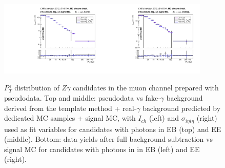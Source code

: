 \begin{figure}[htb]
\begin{center}
\includegraphics[width=0.45\textwidth]{../figs/figs_v11/MUON_ZGamma/PrepareYields/c_BkgSubtrDATAvsSIGMC_c_MUON_ZGamma__UNblind_MCclosure__Barrel__phoEt_MCclosure.pdf}\includegraphics[width=0.45\textwidth]{../figs/figs_v11/MUON_ZGamma/PrepareYields/c_BkgSubtrDATAvsSIGMC_c_MUON_ZGamma__UNblind_MCclosure__Endcap__phoEt_MCclosure.pdf}\\
  \caption{$P_T^{\gamma}$ distribution of $Z\gamma$ candidates in the muon channel prepared with pseudodata. Top and middle: pseudodata vs fake-$\gamma$ background derived from the template method + real-$\gamma$ background predicted by dedicated MC samples + signal MC, with $I_{ch}$ (left) and $\sigma_{i\eta i\eta}$ (right) used as fit variables for candidates with photons in EB (top) and EE (middle). Bottom: data yields after full background subtraction vs signal MC for candidates with photons in in EB (left) and EE (right).}
  \label{fig:DDvsMC_Zg_MCclosure_MUON}
  \end{center}
\end{figure}

